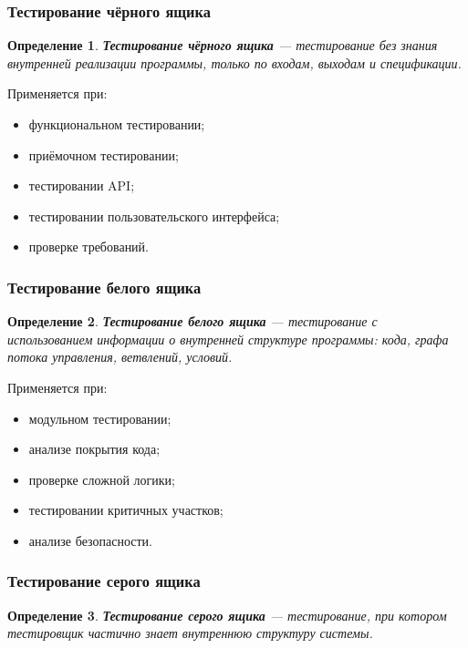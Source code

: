 \documentclass[12pt,a4paper]{article}
\newtheorem{definition}{Определение}
\begin{document}
\subsubsection{Тестирование чёрного ящика}

\begin{definition}
\textbf{Тестирование чёрного ящика} --- тестирование без знания внутренней реализации программы, только по входам, выходам и спецификации.
\end{definition}

Применяется при:
\begin{itemize}
    \item функциональном тестировании;
    \item приёмочном тестировании;
    \item тестировании API;
    \item тестировании пользовательского интерфейса;
    \item проверке требований.
\end{itemize}

\subsubsection{Тестирование белого ящика}

\begin{definition}
\textbf{Тестирование белого ящика} --- тестирование с использованием информации о внутренней структуре программы: кода, графа потока управления, ветвлений, условий.
\end{definition}

Применяется при:
\begin{itemize}
    \item модульном тестировании;
    \item анализе покрытия кода;
    \item проверке сложной логики;
    \item тестировании критичных участков;
    \item анализе безопасности.
\end{itemize}

\subsubsection{Тестирование серого ящика}

\begin{definition}
\textbf{Тестирование серого ящика} --- тестирование, при котором тестировщик частично знает внутреннюю структуру системы.
\end{definition}
\end{document}
